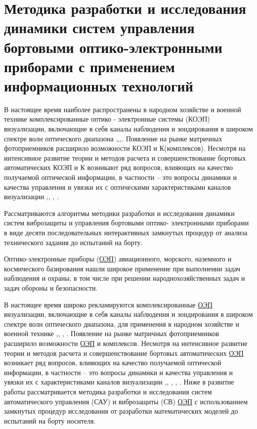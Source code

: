 \chapter{Методика разработки и исследования динамики систем управления бортовыми оптико-электронными приборами с применением информационных технологий} \label{ch:ch2}

В настоящее время наиболее распространены в народном хозяйстве и военной технике комплексированные оптико - электронные системы (КОЭП) визуализации, включающие в себя каналы наблюдения и зондирования в широком спектре волн оптического диапазона \cite[]{Tarasov},\cite[]{Belyakov},\cite[]{Karpov},\cite[]{Torshina}. Появление на рынке матричных фотоприемников расширило возможности КОЭП и К(комплексов). Несмотря на интенсивное развитие   теории и методов расчета и совершенствование бортовых автоматических КОЭП и К  возникают ряд вопросов, влияющих на качество получаемой оптической информации, в частности – это вопросы динамики и качества управления и увязки их с оптическими характеристиками каналов визуализации \cite[]{Belyakov},\cite[]{Karpov}, \cite[]{Baloev16}, \cite[]{Karpov17}.

Рассматриваются алгоритмы методики разработки и исследования динамики систем виброзащиты и управления бортовыми оптико- электронными приборами в виде десяти последовательных интерактивных замкнутых процедур от анализа технического задания до испытаний на борту.

Оптико-электронные приборы (\hyperref[acroEOS]{ОЭП}) авиационного, морского, наземного и космического базирования нашли широкое применение при выполнении задач наблюдения и охраны, в том числе при решении народнохозяйственных задач и задач обороны и безопасности.

В настоящее время широко рекламируются комплексированные \hyperref[acroEOS]{ОЭП} визуализации, включающие в себя каналы наблюдения и зондирования в широком спектре волн оптического диапазона, для применения в народном хозяйстве и военной технике \cite[]{Tarasov},\cite[]{Belyakov}, \cite[]{Torshina}, \cite[]{Ivanov18}. Появление на рынке матричных фотоприемников расширило возможности \hyperref[acroEOS]{ОЭП} и комплексов. Несмотря на интенсивное развитие   теории и методов расчета и совершенствование бортовых автоматических \hyperref[acroEOS]{ОЭП} возникает ряд вопросов, влияющих на качество получаемой оптической информации, в частности – это вопросы динамики и качества управления и увязки их с характеристиками каналов визуализации \cite[]{Tarasov},\cite[]{Belyakov}, \cite[]{Baloev16}, \cite[]{Karpov17}, \cite[]{Gerasin19}. Ниже в развитие работы \cite[]{Tarasov} рассматривается методика разработки и исследования систем автоматического управления (САУ) и виброзащиты (СВ) \hyperref[acroEOS]{ОЭП} с использованием замкнутых процедур исследования от разработки математических моделей до испытаний на борту носителя.


